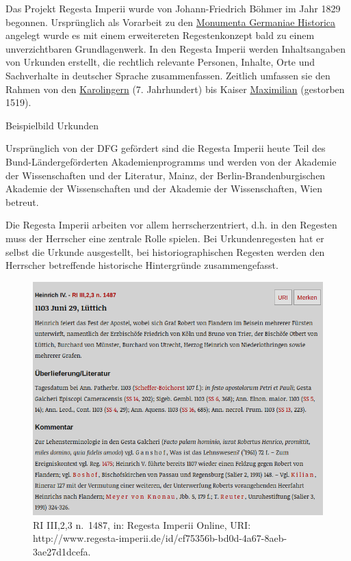 Das Projekt Regesta Imperii wurde von Johann-Friedrich Böhmer im Jahr
1829 begonnen. Ursprünglich als Vorarbeit zu den
\href{https://www.mgh.de}{Monumenta Germaniae Historica} angelegt wurde
es mit einem erweitereten Regestenkonzept bald zu einem unverzichtbaren
Grundlagenwerk. In den Regesta Imperii werden Inhaltsangaben von
Urkunden erstellt, die rechtlich relevante Personen, Inhalte, Orte und
Sachverhalte in deutscher Sprache zusammenfassen. Zeitlich umfassen sie
den Rahmen von den
\href{https://de.wikipedia.org/wiki/Karolinger}{Karolingern} (7.
Jahrhundert) bis Kaiser
\href{https://de.wikipedia.org/wiki/Maximilian_I._(HRR)}{Maximilian}
(gestorben 1519).

Beispielbild Urkunden

Ursprünglich von der DFG gefördert sind die Regesta Imperii heute Teil
des Bund-Ländergeförderten Akademienprogramms und werden von der
Akademie der Wissenschaften und der Literatur, Mainz, der
Berlin-Brandenburgischen Akademie der Wissenschaften und der Akademie
der Wissenschaften, Wien betreut.

Die Regesta Imperii arbeiten vor allem herrscherzentriert, d.h. in den
Regesten muss der Herrscher eine zentrale Rolle spielen. Bei
Urkundenregesten hat er selbst die Urkunde ausgestellt, bei
historiographischen Regesten werden den Herrscher betreffende
historische Hintergründe zusammengefasst.

\begin{figure}
\centering
\includegraphics{Bilder/RI2Graph/ReggH4-Nr-1487.png}
\caption{RI III,2,3 n.~1487, in: Regesta Imperii Online, URI:
http://www.regesta-imperii.de/id/cf75356b-bd0d-4a67-8aeb-3ae27d1dcefa.}
\end{figure}

